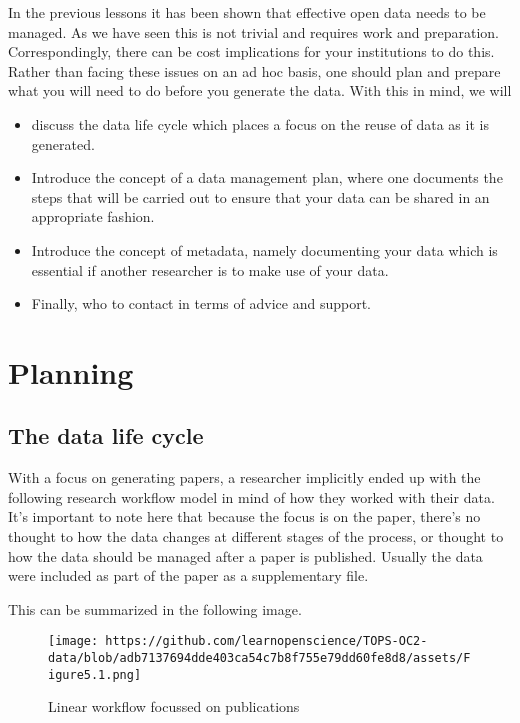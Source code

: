 \documentclass[
  letterpaper,
  DIV=11,
  numbers=noendperiod]{scrreport}
\providecommand{\tightlist}{%
  \setlength{\itemsep}{0pt}\setlength{\parskip}{0pt}}\usepackage{longtable,booktabs,array}
\begin{document}
In the previous lessons it has been shown that effective open data needs
to be managed. As we have seen this is not trivial and requires work and
preparation. Correspondingly, there can be cost implications for your
institutions to do this. Rather than facing these issues on an ad hoc
basis, one should plan and prepare what you will need to do before you
generate the data. With this in mind, we will

\begin{itemize}
\tightlist
\item
  discuss the data life cycle which places a focus on the reuse of data
  as it is generated.
\item
  Introduce the concept of a data management plan, where one documents
  the steps that will be carried out to ensure that your data can be
  shared in an appropriate fashion.
\item
  Introduce the concept of metadata, namely documenting your data which
  is essential if another researcher is to make use of your data.
\item
  Finally, who to contact in terms of advice and support.
\end{itemize}

\hypertarget{planning}{%
\section{Planning}\label{planning}}

\hypertarget{the-data-life-cycle}{%
\subsection{The data life cycle}\label{the-data-life-cycle}}

With a focus on generating papers, a researcher implicitly ended up with
the following research workflow model in mind of how they worked with
their data. It's important to note here that because the focus is on the
paper, there's no thought to how the data changes at different stages of
the process, or thought to how the data should be managed after a paper
is published. Usually the data were included as part of the paper as a
supplementary file.

This can be summarized in the following image.

\begin{figure}

{\centering \texttt{[image: https://github.com/learnopenscience/TOPS-OC2-data/blob/adb7137694dde403ca54c7b8f755e79dd60fe8d8/assets/Figure5.1.png]}

}

\caption{Linear workflow focussed on publications}

\end{figure}
\end{document}
